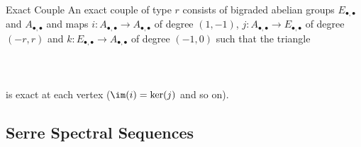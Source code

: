 \documentclass[a4paper]{article}
\begin{document}
\begin{defn}{Exact Couple}{} An exact couple of type $r$ consists of bigraded abelian groups $E_{\bullet,\bullet}$ and $A_{\bullet,\bullet}$ and maps $i:A_{\bullet,\bullet}\to A_{\bullet,\bullet}$ of degree $(1,-1)$, $j:A_{\bullet,\bullet}\to E_{\bullet,\bullet}$ of degree $(-r,r)$ and $k:E_{\bullet,\bullet}\to A_{\bullet,\bullet}$ of degree $(-1,0)$ such that the triangle \\~\\
\\~\\
is exact at each vertex ($\im(i)=\ker(j)$ and so on). 
\end{defn}

\subsection{Serre Spectral Sequences}
\end{document}
